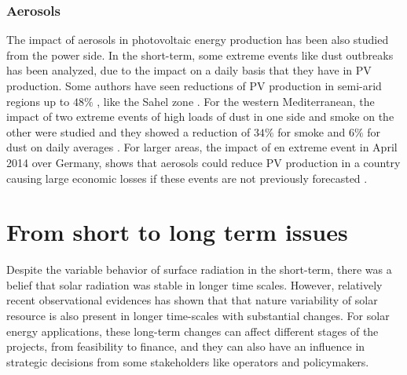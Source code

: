 \subsubsection{Aerosols}

The impact of aerosols in photovoltaic energy production has been also studied from the power side. In the short-term, some  extreme events like dust outbreaks has been analyzed, due to the impact on a daily basis that they have in PV production. Some authors have seen reductions of PV production in semi-arid regions up to $48\%$ , like the Sahel zone \cite*{Neher2017}. For the western Mediterranean, the impact of two extreme events of high loads of dust in one side and smoke on the other were studied and they showed a reduction of $34\%$ for smoke and $6\%$ for dust on daily averages \cite*{Gomez-Amo2019}. For larger areas, the impact of en extreme event in April 2014 over Germany, shows that aerosols could reduce PV production in a country causing large economic losses if these events are not previously forecasted \cite*{Rieger2017}.


\section{From short to long term issues}%

Despite the variable behavior of surface radiation in the short-term, there was a belief that solar radiation was stable in longer time scales. However, relatively recent observational evidences has shown that that nature variability of solar resource is also present in longer time-scales with substantial changes. For solar energy applications, these long-term changes can affect different stages of the projects, from feasibility to finance, and they can also have an influence in strategic decisions from some stakeholders like operators and policymakers.

